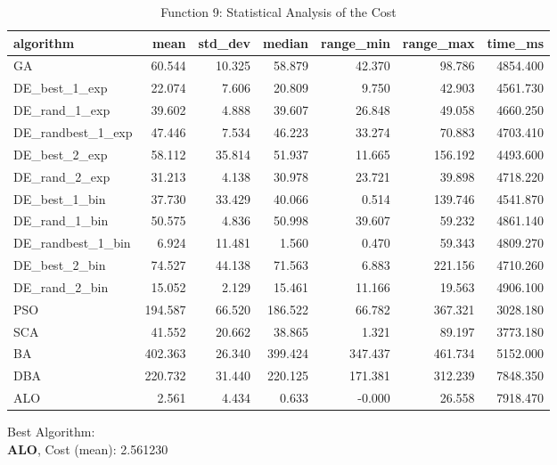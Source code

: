 \documentclass[12pt]{article}
\begin{document}
\begin{table}[H]
    \centering
    \footnotesize
    \begin{adjustbox}{width=1\textwidth}
        \begin{tabular}{lrrrrrr}
            \toprule
            algorithm &    mean &  std\_dev &  median &  range\_min &  range\_max &  time\_ms \\
            \midrule
            GA & 60.544 & 10.325 & 58.879 & 42.370 & 98.786 & 4854.400 \\
            DE\_best\_1\_exp & 22.074 & 7.606 & 20.809 & 9.750 & 42.903 & 4561.730 \\
            DE\_rand\_1\_exp & 39.602 & 4.888 & 39.607 & 26.848 & 49.058 & 4660.250 \\
            DE\_randbest\_1\_exp & 47.446 & 7.534 & 46.223 & 33.274 & 70.883 & 4703.410 \\
            DE\_best\_2\_exp & 58.112 & 35.814 & 51.937 & 11.665 & 156.192 & 4493.600 \\
            DE\_rand\_2\_exp & 31.213 & 4.138 & 30.978 & 23.721 & 39.898 & 4718.220 \\
            DE\_best\_1\_bin & 37.730 & 33.429 & 40.066 & 0.514 & 139.746 & 4541.870 \\
            DE\_rand\_1\_bin & 50.575 & 4.836 & 50.998 & 39.607 & 59.232 & 4861.140 \\
            DE\_randbest\_1\_bin & 6.924 & 11.481 & 1.560 & 0.470 & 59.343 & 4809.270 \\
            DE\_best\_2\_bin & 74.527 & 44.138 & 71.563 & 6.883 & 221.156 & 4710.260 \\
            DE\_rand\_2\_bin & 15.052 & 2.129 & 15.461 & 11.166 & 19.563 & 4906.100 \\
            PSO & 194.587 & 66.520 & 186.522 & 66.782 & 367.321 & 3028.180 \\
            SCA & 41.552 & 20.662 & 38.865 & 1.321 & 89.197 & 3773.180 \\
            BA & 402.363 & 26.340 & 399.424 & 347.437 & 461.734 & 5152.000 \\
            DBA & 220.732 & 31.440 & 220.125 & 171.381 & 312.239 & 7848.350 \\
            ALO & 2.561 & 4.434 & 0.633 & -0.000 & 26.558 & 7918.470 \\
            \bottomrule
        \end{tabular}
        
        
    \end{adjustbox}
    \caption{Function 9: Statistical Analysis of the Cost} 
\end{table}
Best Algorithm: \\
\textbf{ALO}, Cost (mean): 2.561230\\
\newpage
\end{document}
